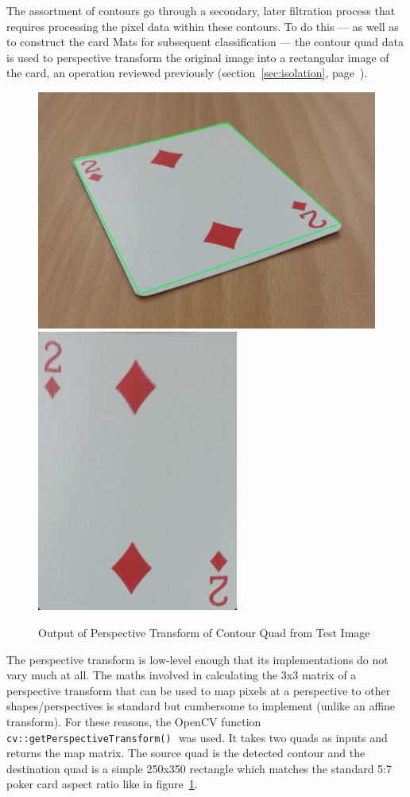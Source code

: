 \documentclass[a4paper,12pt,notitlepage]{article}
\newcommand{\secref}[1]{(section~\ref{#1}, page~\pageref{#1})}
\newcommand{\code}[1]{\colorbox{white}{\lstinline[basicstyle=\ttfamily\color{black}]|#1|} }
\begin{document}
			The assortment of contours go through a secondary, later filtration process that requires processing the pixel data within these contours. To do this --- as well as to construct the card Mats for subsequent classification --- the contour quad data is used to perspective transform the original image into a rectangular image of the card, an operation reviewed previously \secref{sec:isolation}.

			\begin{figure}[ht]
				\centering
				\includegraphics[width=0.6\linewidth]{perstrans1}
				\includegraphics[width=0.3\linewidth]{perstrans2}
				\caption{Output of Perspective Transform of Contour Quad from Test Image}
				\label{fig:perstrans}
			\end{figure}

			The perspective transform is low-level enough that its implementations do not vary much at all. The maths involved in calculating the 3x3 matrix of a perspective transform that can be used to map pixels at a perspective to other shapes/perspectives is standard but cumbersome to implement (unlike an affine transform). For these reasons, the OpenCV function \code{cv::getPerspectiveTransform()} was used. It takes two quads as inputs and returns the map matrix. The source quad is the detected contour and the destination quad is a simple 250x350 rectangle which matches the standard 5:7 poker card aspect ratio like in figure~\ref{fig:perstrans}.
\end{document}
